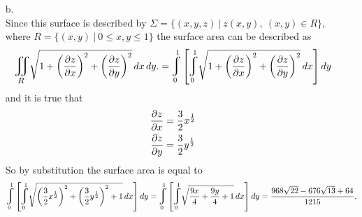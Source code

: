 \documentclass[titlepage]{article}
\begin{document}
\begin{solution}
\begin{itemize}
\item[b.] \phantom{-} \\
Since this surface is described by $\Sigma = \{(x,y,z) \ | \ z(x,y), \ (x,y) \in R\}$, where $R = \{(x,y) \ | \ 0 \leq x,y \leq 1\}$ the surface area can be described as
$$ \bigiint{R}{}\sqrt{1+\left(\frac{\p z}{\p x}\right)^2 + \left(\frac{\p z}{\p y}\right)^2}\, dx\,dy. = \mlvarint\limits_{0}^{1} \left[\mlvarint\limits_{0}^{1}\sqrt{1+\left(\frac{\p z}{\p x}\right)^2 + \left(\frac{\p z}{\p y}\right)^2}\, dx \right]dy$$
and it is true that
\begin{align*}
\frac{\partial z}{\partial x} &= \frac{3}{2}x^{\frac{1}{2}} \\
\frac{\partial z}{\partial y} & = \frac{3}{2}y^{\frac{1}{2}}
\end{align*}
So by substitution the surface area is equal to
$$ \mlvarint\limits_{0}^{1} \left[\mlvarint\limits_{0}^{1}\sqrt{ \left(\frac{3}{2}x^{\frac{1}{2}}\right)^2 + \left(\frac{3}{2}y^{\frac{1}{2}}\right)^2 + 1}\, dx \right]dy = \mlvarint\limits_{0}^{1} \left[\mlvarint\limits_{0}^{1}\sqrt{ \frac{9x}{4} + \frac{9y}{4} + 1}\, dx \right]dy = \frac{968\sqrt{22} - 676\sqrt{13} + 64}{1215}.$$
\end{itemize}
\end{solution}
\end{document}
